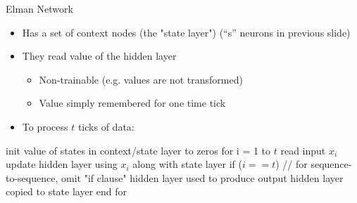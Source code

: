\documentclass[aspectratio=169]{beamer}
\begin{document}
\begin{frame}[fragile]{Elman Network}

\begin{itemize}
	\item Has a set of context nodes (the "state layer") (``s'' neurons in previous slide)
	\item They read value of the hidden layer
	\begin{itemize}
		\item Non-trainable (e.g. values are not transformed)
		\item Value simply remembered for one time tick 
	\end{itemize}
	\item To process $t$ ticks  of data:
\end{itemize}

\begin{SQL}
init value of states in context/state layer to zeros
for i = 1 to $t$
  read input $x_i$
  update hidden layer using $x_i$ along with state layer  
  if ($i == t$) // for sequence-to-sequence, omit "if clause"
    hidden layer used to produce output
  hidden layer copied to state layer
end for 
\end{SQL}
\end{frame}
\end{document}
